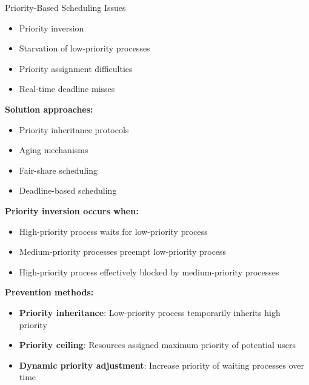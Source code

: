 \begin{minipage}{0.45\linewidth}

\begin{theorem}{Priority-Based Scheduling Issues}
    \begin{itemize}
        \item Priority inversion
        \item Starvation of low-priority processes
        \item Priority assignment difficulties
        \item Real-time deadline misses
    \end{itemize}
    
    \textbf{Solution approaches:}
    \begin{itemize}
        \item Priority inheritance protocols
        \item Aging mechanisms
        \item Fair-share scheduling
        \item Deadline-based scheduling
    \end{itemize}
\end{theorem}
\end{minipage}
\begin{minipage}{0.55\linewidth}

\begin{example}
    \textbf{Priority inversion occurs when:}
    \begin{itemize}
        \item High-priority process waits for low-priority process
        \item Medium-priority processes preempt low-priority process
        \item High-priority process effectively blocked by medium-priority processes
    \end{itemize}
    
    \textbf{Prevention methods:}
    \begin{itemize}
        \item \textbf{Priority inheritance}: Low-priority process temporarily inherits high priority
        \item \textbf{Priority ceiling}: Resources assigned maximum priority of potential users
        \item \textbf{Dynamic priority adjustment}: Increase priority of waiting processes over time
    \end{itemize}
\end{example}
\end{minipage}




